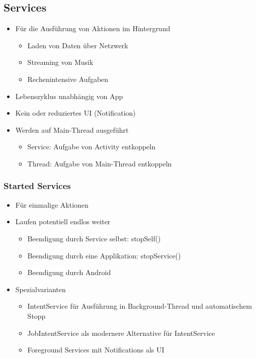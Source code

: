 \subsection{Services}
\begin{itemize}[topsep=0pt, leftmargin=4mm]
    \setlength\itemsep{-0.3em}
    \item Für die Ausführung von Aktionen im Hintergrund
    \begin{itemize}[topsep=0pt, leftmargin=4mm]
        \setlength\itemsep{-0.3em}
        \item Laden von Daten über Netzwerk
        \item Streaming von Musik
        \item Rechenintensive Aufgaben
    \end{itemize}
    \item Lebenszyklus unabhängig von App
    \item Kein oder reduziertes UI (Notification)
    \item Werden auf Main-Thread ausgeführt
    \begin{itemize}[topsep=0pt, leftmargin=4mm]
        \setlength\itemsep{-0.3em}
        \item Service: Aufgabe von Activity entkoppeln
        \item Thread: Aufgabe von Main-Thread entkoppeln
    \end{itemize}
\end{itemize}
\subsubsection{Started Services}
\begin{itemize}[topsep=0pt, leftmargin=4mm]
    \setlength\itemsep{-0.3em}
    \item Für einmalige Aktionen
    \item Laufen potentiell endlos weiter
    \begin{itemize}[topsep=0pt, leftmargin=4mm]
        \setlength\itemsep{-0.3em}
        \item Beendigung durch Service selbst: stopSelf()
        \item Beendigung durch eine Applikation: stopService()
        \item Beendigung durch Android
    \end{itemize}
    \item Spezialvarianten
    \begin{itemize}[topsep=0pt, leftmargin=4mm]
        \setlength\itemsep{-0.3em}
        \item IntentService für Ausführung in Background-Thread und automatischem Stopp
        \item JobIntentService als modernere Alternative für IntentService
        \item Foreground Services mit Notifications als UI
    \end{itemize}
\end{itemize}
